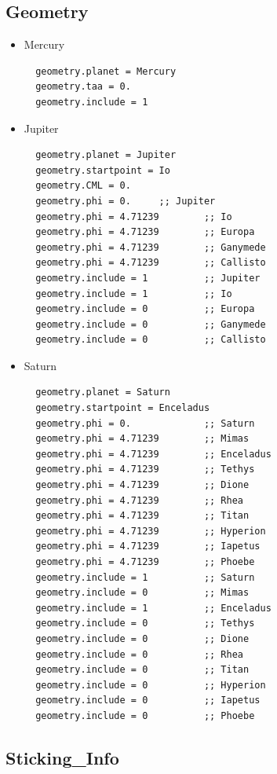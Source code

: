 \documentclass[11pt]{article}
\begin{document}
\subsection{Geometry}
\begin{itemize}
\item Mercury
  \begin{verbatim}
  geometry.planet = Mercury
  geometry.taa = 0.
  geometry.include = 1
  \end{verbatim}

\item Jupiter
  \begin{verbatim}
  geometry.planet = Jupiter
  geometry.startpoint = Io
  geometry.CML = 0.
  geometry.phi = 0.		;; Jupiter
  geometry.phi = 4.71239        ;; Io
  geometry.phi = 4.71239        ;; Europa
  geometry.phi = 4.71239        ;; Ganymede
  geometry.phi = 4.71239        ;; Callisto
  geometry.include = 1          ;; Jupiter
  geometry.include = 1          ;; Io 
  geometry.include = 0          ;; Europa
  geometry.include = 0          ;; Ganymede
  geometry.include = 0          ;; Callisto
  \end{verbatim}

\item Saturn
  \begin{verbatim}
  geometry.planet = Saturn
  geometry.startpoint = Enceladus
  geometry.phi = 0.             ;; Saturn
  geometry.phi = 4.71239        ;; Mimas
  geometry.phi = 4.71239        ;; Enceladus
  geometry.phi = 4.71239        ;; Tethys
  geometry.phi = 4.71239        ;; Dione
  geometry.phi = 4.71239        ;; Rhea
  geometry.phi = 4.71239        ;; Titan
  geometry.phi = 4.71239        ;; Hyperion
  geometry.phi = 4.71239        ;; Iapetus
  geometry.phi = 4.71239        ;; Phoebe
  geometry.include = 1          ;; Saturn
  geometry.include = 0          ;; Mimas
  geometry.include = 1          ;; Enceladus
  geometry.include = 0          ;; Tethys
  geometry.include = 0          ;; Dione
  geometry.include = 0          ;; Rhea
  geometry.include = 0          ;; Titan
  geometry.include = 0          ;; Hyperion
  geometry.include = 0          ;; Iapetus
  geometry.include = 0          ;; Phoebe
  \end{verbatim}
\end{itemize}

\subsection{Sticking\_Info}
\end{document}
